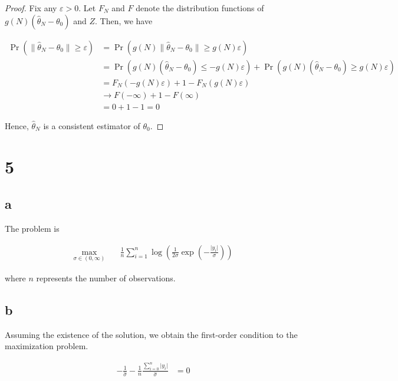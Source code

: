 \documentclass[11pt]{article}
\renewcommand{\hat}{\widehat}
\theoremstyle{definition}
\begin{document}
\begin{proof}
    Fix any $\varepsilon > 0$. Let $F_N$ and $F$ denote the distribution functions of $g(N) (\hat{\theta}_N - \theta_0)$ and $Z$. Then, we have

    \begin{align*}
    \Pr( \lVert \hat{\theta}_N - \theta_0 \rVert \geq \varepsilon)
    &= \Pr( g(N) \lVert \hat{\theta}_N - \theta_0 \rVert \geq g(N) \varepsilon) \\
    &= \Pr( g(N) (\hat{\theta}_N - \theta_0) \leq - g(N) \varepsilon) +
    \Pr ( g(N) (\hat{\theta}_N - \theta_0 )\geq  g(N) \varepsilon) \\
    &= F_N(-g(N) \varepsilon) + 1 - F_N(g(N) \varepsilon) \\
    &\to F(-\infty) + 1 - F(\infty) \\
    &= 0 + 1 - 1 = 0
    \end{align*}

    Hence, $\hat{\theta}_N$ is a consistent estimator of $\theta_0$.
\end{proof}

\pagebreak
\section*{5}
\subsection*{a}

The problem is

\begin{align*}
    \max_{\sigma \in (0, \infty)}& \quad \frac{1}{n} \sum_{i=1}^{n} \log\left( \frac{1}{2\sigma} \exp(- \frac{\lvert y_i\rvert}{\sigma})\right)
\end{align*}

where $n$ represents the number of observations.

\subsection*{b}

Assuming the existence of the solution, we obtain the first-order condition to the maximization problem.


\begin{align*}
    - \frac{1}{\hat{\sigma}} - \frac{1}{n} \frac{\sum_{i=0}^{n} \lvert y_i \rvert}{\hat{\sigma}} &= 0
\end{align*}
\end{document}

